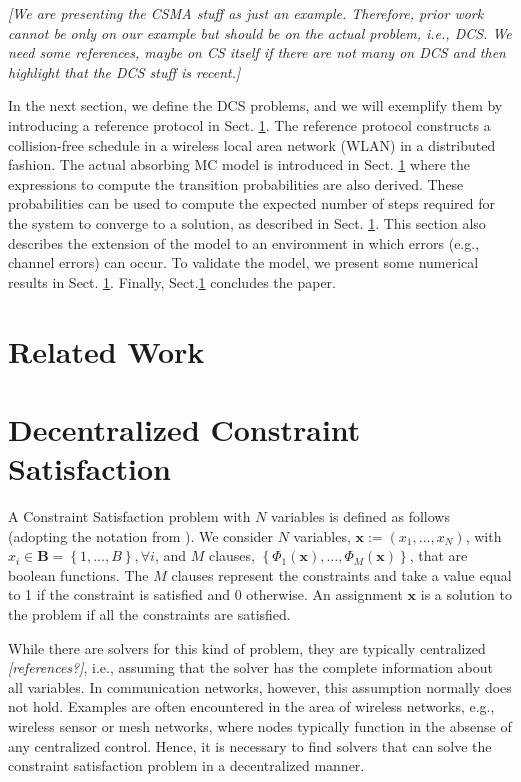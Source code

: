 \documentclass[journal]{IEEEtran}
\newcommand{\AzCom}[1]{{\it \color{magenta} [#1]}}
\begin{document}
\AzCom{We are presenting the CSMA stuff as just an example. Therefore, prior work cannot be only on our example but should be on the actual problem, i.e., DCS. We need some references, maybe on CS itself if there are not many on DCS and then highlight that the DCS stuff is recent.}

In the next section, we define the DCS problems, and we will exemplify them by introducing a reference protocol in Sect. \ref{}. The reference protocol constructs a collision-free schedule in a wireless local area network (WLAN) in a distributed fashion. 
The actual absorbing MC model is introduced in Sect. \ref{} where the expressions to compute the transition probabilities are also derived.
These probabilities can be used to compute the expected number of steps required for the system to converge to a solution, as described in Sect. \ref{}.
This section also describes the extension of the model to an environment in which errors (e.g., channel errors) can occur.
To validate the model, we present some numerical results in Sect. \ref{}.
Finally, Sect.\ref{} concludes the paper.

\section{Related Work}


\section{Decentralized Constraint Satisfaction}
\label{sec:dcs}
A Constraint Satisfaction problem with $N$ variables is defined as follows (adopting the notation from \cite{duffy2011dcs}).
We consider $N$ variables,  \mbox{$\mathbf{x} := (x_1,\dots,x_N)$}, with $x_i \in \mathbf{B}=\left\{1, \dots, B \right\}, \forall i $, and $M$ clauses, $\left\{ \Phi_1(\mathbf{x}),\dots,\Phi_M(\mathbf{x}) \right\}$, that are boolean functions.
The $M$ clauses represent the constraints and take a value equal to 1 if the constraint is satisfied and 0 otherwise.
An assignment $\mathbf{x}$ is a solution to the problem if all the constraints are satisfied.

While there are solvers for this kind of problem, they are typically centralized \AzCom{references?}, i.e., assuming that the solver has the complete information about all variables. In communication networks, however, this assumption normally does not hold. Examples are often encountered in the area of wireless networks, e.g., wireless sensor or mesh networks, where nodes typically function in the absense of any centralized control. Hence, it is necessary to find solvers that can solve the constraint satisfaction problem in a decentralized manner. 
\end{document}
